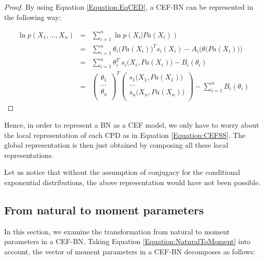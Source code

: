 \documentclass[11pt, oneside]{article}   	%
\numberwithin{figure}{section}
\numberwithin{equation}{section}
\numberwithin{table}{section}
\theoremstyle{definition}
\begin{document}
\begin{proof}
By using Equation \ref{Equation:EqCED}, a CEF-BN can be represented in the following way: 

\begin{eqnarray}
\label{Equation:CEFSS}
\ln p(X_1,\ldots, X_n) &=& \sum_{i=1}^n \ln p(X_i|Pa(X_i))\nonumber\\
&=& \sum_{i=1}^n \theta_i \big(Pa(X_i)\big)^T s_i(X_i) - A_i\Big(\theta\big(Pa(X_i)\big)\Big)\nonumber\\
&=& \sum_{i=1}^n \theta_i^T~s_i\big(X_i, Pa(X_i)\big) - B_i(\theta_i)\nonumber\\
&=&
\begin{pmatrix}
\theta_1\\
\ldots \\
\theta_n\\
\end{pmatrix}^T
\begin{pmatrix}
s_1\big(X_1,Pa(X_1)\big) \\
\ldots \\
s_n\big(X_n,Pa(X_n)\big) \\
\end{pmatrix}
- \sum_{i=1}^n B_i(\theta_i)
\end{eqnarray}
\end{proof}

Hence, in order to represent a BN as a CEF model, we only have to worry about the local representation of each CPD as in Equation \ref{Equation:CEFSS}. The global representation is then just obtained by composing all these local representations. 

Let us notice that without the assumption of conjugacy  for the conditional exponential distributions, the above representation would have not been possible. 

\subsection{From natural to moment parameters} \label{Section:CEFBN:NaturalToMoment}

In this section, we examine the transformation from natural to moment parameters in a CEF-BN. Taking Equation \ref{Equation:NaturalToMoment} into account, the vector of moment parameters in a CEF-BN decomposes as follows:
\end{document}
